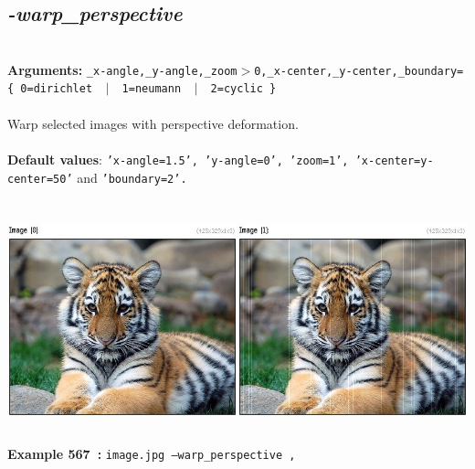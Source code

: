 \documentclass[a4paper,11pt,twoside]{book}
\begin{document}
\subsection{\emph{-warp\_perspective} }\vspace*{-0.5em}
~\\\textbf{Arguments: } 
{\small \texttt{\_x-angle,\_y-angle,\_zoom$>$0,\_x-center,\_y-center,\_boundary=\{ 0=dirichlet ~$|$~ 1=neumann ~$|$~ 2=cyclic \}}}\\~\\
Warp selected images with perspective deformation.
~\\~\\\textbf{Default values}: {\small \texttt{'x-angle=1.5', 'y-angle=0', 'zoom=1', 'x-center=y-center=50'} and \texttt{'boundary=2'.}}
\begin{center}\includegraphics[keepaspectratio=true,height=7cm,width=\textwidth]{img/gmic_def567.jpg}\\
{\footnotesize \textbf{Example 567~:} \texttt{image.jpg --warp\_perspective ,}}
\end{center}
\end{document}
